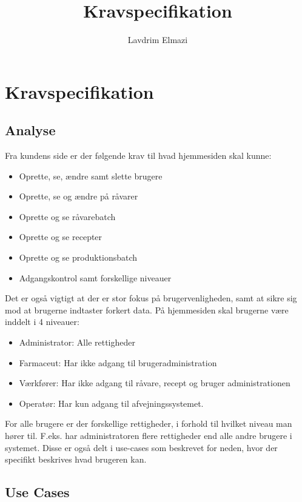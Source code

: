 \documentclass[a4paper]{article}
\title{Kravspecifikation}
\author{
  Lavdrim Elmazi
}
\begin{document}
\maketitle

\section{Kravspecifikation} %

\subsection{Analyse} %
Fra kundens side er der følgende krav til hvad hjemmesiden skal kunne:

\begin{itemize}
  \item Oprette, se, ændre samt slette brugere
  \item Oprette, se og ændre på råvarer
  \item Oprette og se råvarebatch 
  \item Oprette og se recepter
  \item Oprette og se produktionsbatch
  \item Adgangskontrol samt forskellige niveauer
\end{itemize}

Det er også vigtigt at der er stor fokus på brugervenligheden, samt at sikre sig mod at brugerne indtaster forkert data. På hjemmesiden skal brugerne være inddelt i 4 niveauer:

\begin{itemize}
  \item Administrator: Alle rettigheder
  \item Farmaceut: Har ikke adgang til brugeradministration
  \item Værkfører: Har ikke adgang til råvare, recept og bruger administrationen 
  \item Operatør: Har kun adgang til afvejningssystemet. 
\end{itemize}

For alle brugere er der forskellige rettigheder, i forhold til hvilket niveau man hører til. F.eks. har administratoren flere rettigheder end alle andre brugere i systemet. Disse er også delt i use-cases som beskrevet for neden, hvor der specifikt beskrives hvad brugeren kan. 


\subsection{Use Cases} %
\end{document}
